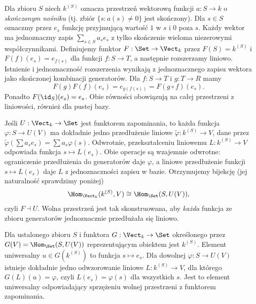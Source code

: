\begin{przyklad}\label{przyklad:free-vect}
Dla zbioru $S$ niech $k^{(S)}$ oznacza przestrzeń wektorową funkcji $a:S\to k$ o \emph{skończonym nośniku} (tj. zbiór $\{s:a(s)\neq0\}$ jest skończony). Dla $s\in S$ oznaczmy przez $e_s$ funkcję przyjmującą wartość $1$ w $s$ i $0$ poza $s$. Każdy wektor ma jednoznaczny zapis $\sum_{s\in S}a_s e_s$ z tylko skończenie wieloma niezerowymi współczynnikami. Definiujemy funktor $F:\Set\to\Vect_k$ przez $F(S)=k^{(S)}$ i $F(f)(e_s)=e_{f(s)}$ dla funkcji $f:S\to T$, a następnie rozszerzamy liniowo. Istnienie i jednoznaczność rozszerzenia wynikają z jednoznacznego zapisu wektora jako skończonej kombinacji generatorów. Dla $f:S\to T$ i $g:T\to R$ mamy
\[
F(g)F(f)(e_s)=e_{g(f(s))}=F(g\circ f)(e_s).
\]
Ponadto $F(\id_S)(e_s)=e_s$. Obie równości obowiązują na całej przestrzeni z liniowości, również dla pustej bazy.

Jeśli $U:\Vect_k\to\Set$ jest funktorem zapominania, to każda funkcja $\varphi:S\to U(V)$ ma dokładnie jedno przedłużenie liniowe $\widetilde\varphi:k^{(S)}\to V$, dane przez $\widetilde\varphi(\sum a_s e_s)=\sum a_s\varphi(s)$. Odwrotnie, przekształceniu liniowemu $L:k^{(S)}\to V$ odpowiada funkcja $s\mapsto L(e_s)$. Obie operacje są wzajemnie odwrotne: ograniczenie przedłużenia do generatorów daje $\varphi$, a liniowe przedłużenie funkcji $s\mapsto L(e_s)$ daje $L$ z jednoznaczności zapisu w bazie. Otrzymujemy bijekcję (jej naturalność sprawdzimy poniżej)
\[
\Hom_{\Vect_k}(k^{(S)},V)\cong\Hom_{\Set}(S,U(V)),
\]
czyli $F\dashv U$. Wolna przestrzeń jest tak skonstruowana, aby \emph{każda} funkcja ze zbioru generatorów jednoznacznie przedłużała się liniowo.
\end{przyklad}

\begin{przyklad}
Dla ustalonego zbioru $S$ i funktora $G:\Vect_k\to\Set$ określonego przez $G(V)=\Hom_{\Set}(S,U(V))$ reprezentującym obiektem jest $k^{(S)}$. Element uniwersalny $u\in G(k^{(S)})$ to funkcja $s\mapsto e_s$. Dla dowolnej $\varphi:S\to U(V)$ istnieje dokładnie jedno odwzorowanie liniowe $L:k^{(S)}\to V$, dla którego $G(L)(u)=\varphi$, czyli $L(e_s)=\varphi(s)$ dla wszystkich $s$. Jest to element uniwersalny odpowiadający sprzężeniu wolnej przestrzeni z funktorem zapominania.
\end{przyklad}

